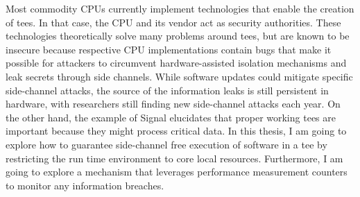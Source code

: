 Most commodity CPUs currently implement technologies that enable the creation of
\glspl{tee}. In that case, the CPU and its vendor act as security
authorities.\cite{tdx_whitepaper,kaplan_amd_2020,pinto_demystifying_2019,costan2016intel}
These technologies theoretically solve many problems around \glspl{tee}, but are
known to be insecure because respective CPU implementations contain bugs that
make it possible for attackers to circumvent hardware-assisted isolation
mechanisms and leak secrets through side
channels.\cite{kocher_spectre_2020,lipp_meltdown_2020,nilsson_survey_2020} While
software updates could mitigate specific side-channel attacks, the source of the
information leaks is still persistent in hardware, with researchers still
finding new side-channel attacks each
year.\cite{wikner2022retbleed,moghimi_downfall_2023,ragab_ghostrace_2024} On the
other hand, the example of Signal elucidates that proper working \glspl{tee} are
important because they might process critical data. In this thesis, I am going
to explore how to guarantee side-channel free execution of software in a
\gls{tee} by restricting the run time environment to core local resources.
Furthermore, I am going to explore a mechanism that leverages performance
measurement counters to monitor any information breaches.
